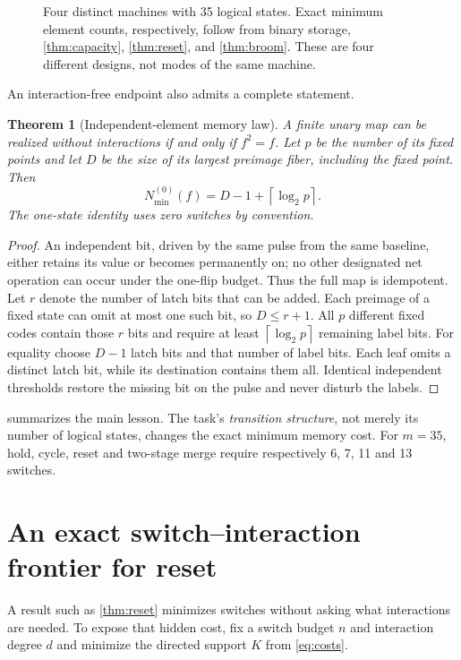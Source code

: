 \documentclass[12pt,letterpaper]{article}
\newtheorem{theorem}{Theorem}[section]
\theoremstyle{definition}\newtheorem{definition}[theorem]{Definition}
\theoremstyle{remark}\newtheorem{remark}[theorem]{Remark}
\newcommand{\Nmin}{N_{\min}}
\newcommand{\ceil}[1]{\left\lceil #1\right\rceil}
\begin{document}
\begin{figure}[ht]
\centering\resizebox{\linewidth}{!}{}
\caption{Four distinct machines with 35 logical states. Exact minimum element counts, respectively, follow from binary storage, \cref{thm:capacity}, \cref{thm:reset}, and \cref{thm:broom}. These are four different designs, not modes of the same machine.}
\label{fig:tasks}
\end{figure}

An interaction-free endpoint also admits a complete statement.
\begin{theorem}[Independent-element memory law]\label{thm:independent}
A finite unary map can be realized without interactions if and only if $f^2=f$. Let $p$ be the number of its fixed points and let $D$ be the size of its largest preimage fiber, including the fixed point. Then
\begin{equation}\label{eq:independent}
\boxed{\Nmin^{(0)}(f)=D-1+\ceil{\log_2p}.}
\end{equation}
The one-state identity uses zero switches by convention.
\end{theorem}
\begin{proof}
An independent bit, driven by the same pulse from the same baseline, either retains its value or becomes permanently on; no other designated net operation can occur under the one-flip budget. Thus the full map is idempotent. Let $r$ denote the number of latch bits that can be added. Each preimage of a fixed state can omit at most one such bit, so $D\le r+1$. All $p$ different fixed codes contain those $r$ bits and require at least $\ceil{\log_2p}$ remaining label bits. For equality choose $D-1$ latch bits and that number of label bits. Each leaf omits a distinct latch bit, while its destination contains them all. Identical independent thresholds restore the missing bit on the pulse and never disturb the labels.
\end{proof}

 summarizes the main lesson. The task's \emph{transition structure}, not merely its number of logical states, changes the exact minimum memory cost. For $m=35$, hold, cycle, reset and two-stage merge require respectively 6, 7, 11 and 13 switches.

\section{An exact switch--interaction frontier for reset}\label{sec:frontier}
A result such as \cref{thm:reset} minimizes switches without asking what interactions are needed. To expose that hidden cost, fix a switch budget $n$ and interaction degree $d$ and minimize the directed support $K$ from \eqref{eq:costs}.
\end{document}

